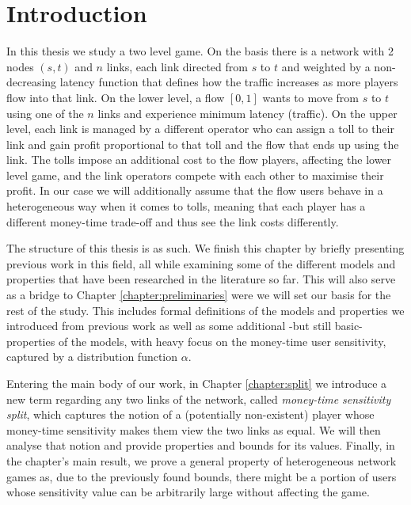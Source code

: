 \documentclass[10pt,a4paper]{book}
\theoremstyle{definition}
\theoremstyle{comment}
\begin{document}
\clearpage

\thispagestyle{empty}
\null
\clearpage

\pagestyle{fancy}

\tableofcontents
\clearpage

\thispagestyle{empty}
\null
\clearpage



\chapter{Introduction}
\label{chapter:intro}

In this thesis we study a two level game.
On the basis there is a network with 2 nodes $(s, t)$ and $n$ links, each link directed from $s$ to $t$ and weighted by a non-decreasing latency function that defines how the traffic increases as more players flow into that link.
On the lower level, a flow $[0, 1]$ wants to move from $s$ to $t$ using one of the $n$ links and experience minimum latency (traffic).
On the upper level, each link is managed by a different operator who can assign a toll to their link and gain profit proportional to that toll and the flow that ends up using the link.
The tolls impose an additional cost to the flow players, affecting the lower level game, and the link operators compete with each other to maximise their profit.
In our case we will additionally assume that the flow users behave in a heterogeneous way when it comes to tolls, meaning that each player has a different money-time trade-off and thus see the link costs differently.

The structure of this thesis is as such.
We finish this chapter by briefly presenting previous work in this field, all while examining some of the different models and properties that have been researched in the literature so far.
This will also serve as a bridge to Chapter \ref{chapter:preliminaries} were we will set our basis for the rest of the study.
This includes formal definitions of the models and properties we introduced from previous work as well as some additional -but still basic- properties of the models, with heavy focus on the money-time user sensitivity, captured by a distribution function $\alpha$.

Entering the main body of our work, in Chapter \ref{chapter:split} we introduce a new term regarding any two links of the network, called \textit{money-time sensitivity split}, which captures the notion of a (potentially non-existent) player whose money-time sensitivity makes them view the two links as equal.
We will then analyse that notion and provide properties and bounds for its values.
Finally, in the chapter's main result, we prove a general property of heterogeneous network games as, due to the previously found bounds, there might be a portion of users whose sensitivity value can be arbitrarily large without affecting the game.
\end{document}
